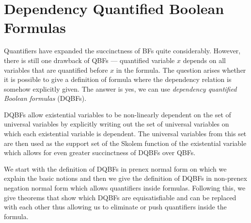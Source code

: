 \documentclass[
  digital, %
  twoside, %
  table,   %
  nolof,     %
  nolot,     %
]{fithesis3}
\let\setbuilder\set
\newcommand{\simpleset}[1]{\{{#1}\}}
\renewcommand{\set}[1]{\normalexpandarg\IfSubStr{#1}{|}{\setbuilder{#1}}{\simpleset{#1}}}
\theoremstyle{definition}
\theoremstyle{remark}
\newcommand{\BF}[1]{\mathbf{\Phi}_{#1}^{\normalfont{\text{\tiny BF}}}}
\begin{document}


\section{Dependency Quantified Boolean Formulas}
Quantifiers have expanded the succinctness of BFs quite considerably. However, there is still one drawback of QBFs --- quantified variable $x$ depends on all variables that are quantified before $x$ in the formula. The question arises whether it is possible to give a definition of formula where the dependency relation is somehow explicitly given. The answer is yes, we can use \emph{dependency quantified Boolean formulas} (DQBFs).

DQBFs allow existential variables to be non-linearly dependent on the set of universal variables by explicitly writing out the set of universal variables on which each existential variable is dependent. The universal variables from this set are then used as the support set of the Skolem function of the existential variable which allows for even greater succinctness of DQBFs over QBFs.  

We start with the definition of DQBFs in prenex normal form on which we explain the basic notions and then we give the definition of DQBFs in non-prenex negation normal form which allows quantifiers inside formulas. Following this, we give theorems that show which DQBFs are equisatisfiable and can be replaced with each other thus allowing us to eliminate or push quantifiers inside the formula.
\end{document}
